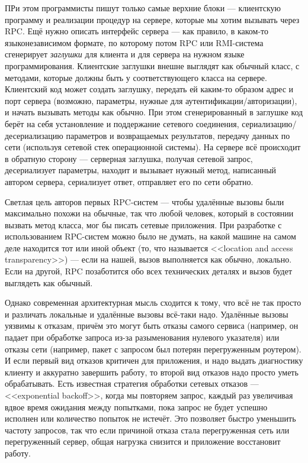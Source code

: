 \documentclass[a5paper]{article}
\begin{document}
ПРи этом программисты пишут только самые верхние блоки --- клиентскую программу и реализации процедур на сервере, которые мы хотим вызывать через RPC. Ещё нужно описать интерфейс сервера --- как правило, в каком-то языконезависимом формате, по которому потом RPC или RMI-система сгенерирует \emph{заглушки} для клиента и для сервера на нужном языке программирования. Клиентские заглушки внешне выглядят как обычный класс, с методами, которые должны быть у соответствующего класса на сервере. Клиентский код может создать заглушку, передать ей каким-то образом адрес и порт сервера (возможно, параметры, нужные для аутентификации/авторизации), и начать вызывать методы как обычно. При этом сгенерированный в заглушке код берёт на себя установление и поддержание сетевого соединения, сериализацию/десериализацию параметров и возвращаемых результатов, передачу данных по сети (используя сетевой стек операционной системы). На сервере всё происходит в обратную сторону --- серверная заглушка, получая сетевой запрос, десериализует параметры, находит и вызывает нужный метод, написанный автором сервера, сериализует ответ, отправляет его по сети обратно.

Светлая цель авторов первых RPC-систем --- чтобы удалённые вызовы были максимально похожи на обычные, так что любой человек, который в состоянии вызвать метод класса, мог бы писать сетевые приложения. При разработке с использованием RPС-систем можно было не думать, на какой машине на самом деле находится тот или иной объект (то, что называется <<location and access transparency>>) --- если на нашей, вызов выполняется как обычно, локально. Если на другой, RPC позаботится обо всех технических деталях и вызов будет выглядеть как обычный.

Однако современная архитектурная мысль сходится к тому, что всё не так просто и различать локальные и удалённые вызовы всё-таки надо. Удалённые вызовы уязвимы к отказам, причём это могут быть отказы самого сервиса (например, он падает при обработке запроса из-за разыменования нулевого указателя) или отказы сети (например, пакет с запросом был потерян перегруженным роутером). И если первый вид отказов критичен для приложения, и надо выдать диагностику клиенту и аккуратно завершить работу, то второй вид отказов надо просто уметь обрабатывать. Есть известная стратегия обработки сетевых отказов --- <<exponential backoff>>, когда мы повторяем запрос, каждый раз увеличивая вдвое время ожидания между попытками, пока запрос не будет успешно исполнен или количество попыток не истечёт. Это позволяет быстро уменьшить частоту запросов, так что если причиной отказа стала перегруженная сеть или перегруженный сервер, общая нагрузка снизится и приложение восстановит работу.
\end{document}
